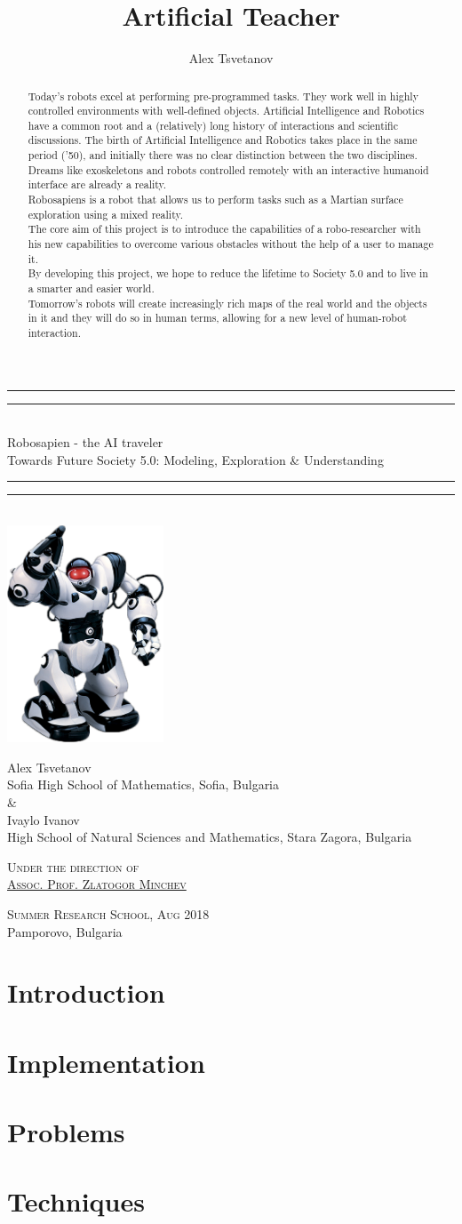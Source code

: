 \documentclass[a4paper, 12pt]{article}
\title{Artificial Teacher}
\author{Alex Tsvetanov}
\newcommand{\titleGP}{\begingroup
	\centering
	\rule{\textwidth}{1.6pt}\vspace{-\baselineskip}\vspace{2pt}
	\rule{\textwidth}{0.4pt}\\[\baselineskip]
	
	{\LARGE Robosapien - the AI traveler \\ \small{Towards Future Society 5.0: Modeling, Exploration \& Understanding}}\\[0.2\baselineskip]
	
	\rule{\textwidth}{0.4pt}\vspace{-\baselineskip}\vspace{3.2pt}
	\rule{\textwidth}{1.6pt}\\[\baselineskip]
		\includegraphics[width=0.35\textwidth]{robot.png}
	
	\vspace{50pt}
	{
	{\LARGE Alex Tsvetanov}\\
	{\normalsize Sofia High School of Mathematics, Sofia, Bulgaria}\\\vspace{0.5cm} \& \vspace{0.5cm} \\
	{\LARGE Ivaylo Ivanov}\\
	{\normalsize High School of Natural Sciences and Mathematics, Stara Zagora, Bulgaria}\par}
	
	\vspace{2\baselineskip}
	
	{\scshape \large
		Under the direction of \\
		\hspace{-0.3cm}\href{https://bg.linkedin.com/in/zlatogor-minchev-a101b85}{Assoc. Prof. Zlatogor Minchev} \\\par
	}
	\vspace{1cm}
	
	
	\vfill
	
	{\scshape Summer Research School, Aug 2018} \\[0.3\baselineskip]
	{\large Pamporovo, Bulgaria }\par
	
	\endgroup}
\begin{document}
	
	\titleGP
	\newpage
	
	\tableofcontents
	\newpage
	
	\begin{abstract}
		Today's robots excel at performing pre-programmed tasks. They work well in
		highly controlled environments with well-defined objects. Artificial Intelligence
		and Robotics have a common root and a (relatively) long history of interactions
		and scientific discussions. The birth of Artificial Intelligence and Robotics takes
		place in the same period ('50), and initially there was no clear distinction
		between the two disciplines. Dreams like exoskeletons and robots controlled
		remotely with an interactive humanoid interface are already a reality. \\
		
		Robosapiens is a robot that allows us to perform tasks such as a Martian surface
		exploration using a mixed reality.\\
		
		The core aim of this project is to introduce the capabilities of a robo-researcher with
		his new capabilities to overcome various obstacles without the help of a user to
		manage it.\\
		
		By developing this project, we hope to reduce the lifetime to Society 5.0 and to live in a smarter and easier world. \\
		
		Tomorrow's robots will create increasingly rich maps of the real world and the
		objects in it and they will do so in human terms, allowing for a new level of human-robot interaction.
	\end{abstract}
	\newpage
	
	\section{Introduction}
	
	\section{Implementation}
	
	\section{Problems}
	
	\section{Techniques}
	
\end{document}
